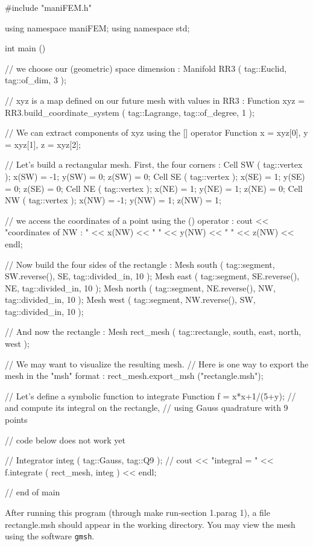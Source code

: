 \verbatim
#include "maniFEM.h"

using namespace maniFEM;
using namespace std;

int main ()

{  // we choose our (geometric) space dimension :
   Manifold RR3 ( tag::Euclid, tag::of_dim, 3 );
   
   // xyz is a map defined on our future mesh with values in RR3 :
   Function xyz = RR3.build_coordinate_system ( tag::Lagrange, tag::of_degree, 1 );

   // We can extract components of xyz using the [] operator
   Function x = xyz[0],  y = xyz[1],  z = xyz[2];

   // Let's build a rectangular mesh. First, the four corners :
   Cell SW ( tag::vertex );  x(SW) = -1;  y(SW) = 0;  z(SW) = 0;
   Cell SE ( tag::vertex );  x(SE) =  1;  y(SE) = 0;  z(SE) = 0;
   Cell NE ( tag::vertex );  x(NE) =  1;  y(NE) = 1;  z(NE) = 0;
   Cell NW ( tag::vertex );  x(NW) = -1;  y(NW) = 1;  z(NW) = 1;
   
   // we access the coordinates of a point using the () operator :
   cout << "coordinates of NW : " << x(NW) << " " << y(NW) << " " << z(NW) << endl;
   
   // Now build the four sides of the rectangle :
   Mesh south ( tag::segment, SW.reverse(), SE, tag::divided_in, 10 );
   Mesh east  ( tag::segment, SE.reverse(), NE, tag::divided_in, 10 );
   Mesh north ( tag::segment, NE.reverse(), NW, tag::divided_in, 10 );
   Mesh west  ( tag::segment, NW.reverse(), SW, tag::divided_in, 10 );
   
   // And now the rectangle :
   Mesh rect_mesh ( tag::rectangle, south, east, north, west );

   // We may want to visualize the resulting mesh.
   // Here is one way to export the mesh in the "msh" format :
   rect_mesh.export_msh ("rectangle.msh");

   // Let's define a symbolic function to integrate
   Function f = x*x+1/(5+y);
   // and compute its integral on the rectangle,
   // using Gauss quadrature with 9 points

   // code below does not work yet

   // Integrator integ ( tag::Gauss, tag::Q9 );
   // cout << "integral = " << f.integrate ( rect_mesh, integ ) << endl;

}  // end of main
\endverbatim

After running this program (through {\codett make run-\numb section 1.\numb parag 1}), a file
{\codett rectangle.msh} should appear in the working directory.
You may view the mesh using the software {\tt gmsh}.

